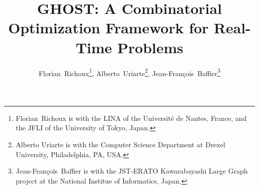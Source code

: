 \documentclass[journal]{IEEEtran}
\newcommand{\ghost}{\textsc{GHOST}\xspace}
\begin{document}


%
\title{\ghost: A Combinatorial Optimization Framework for Real-Time Problems}
%
%
%


\author{Florian~Richoux\thanks{Florian~Richoux is with the LINA of the Universit{\'e} de Nantes, France, and the JFLI of the University of Tokyo, Japan.},
        Alberto~Uriarte\thanks{Alberto  Uriarte is  with the  Computer
          Science Department  at Drexel University,  Philadelphia, PA,
          USA.},
        Jean-Fran{\c  c}ois~Baffier\thanks{Jean-Fran{\c  c}ois~Baffier
          is with the JST-ERATO Kawarabayashi Large Graph project at the National Institue of Informatics, Japan.}}



%
%
\end{document}
